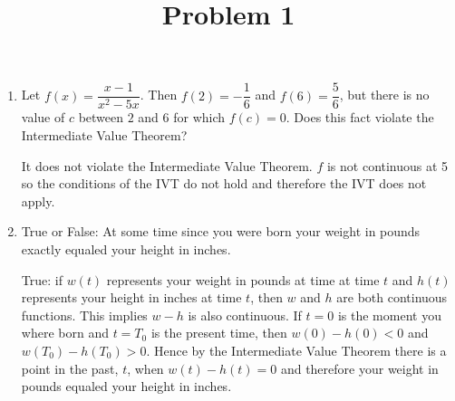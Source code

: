 \documentclass{ximera}
\title[Problem 1]{Problem 1}
\begin{document}
\begin{abstract} \end{abstract}
\maketitle


\begin{problem}
	\begin{enumerate}
   	\item  Let $f(x) = \dfrac{x-1}{x^2 - 5x}$.  Then $f(2)=-\dfrac{1}{6}$ and $f(6)=\dfrac{5}{6}$, but there is no value of $c$ between $2$ and $6$ for which $f(c)=0$.  Does this fact violate the Intermediate Value Theorem?
\begin{explanation}
        It does not violate the Intermediate Value Theorem.  $f$ is not continuous at 5 so the conditions of the IVT do not hold and therefore the IVT does not apply.
      \end{explanation}

	\item	True or False: At some time since you were born your weight in pounds exactly equaled your height in inches.
\begin{explanation}
        True: if $w(t)$ represents your weight in pounds at time at time $t$ and $h(t)$ represents your height in inches at time $t$, then $w$ and $h$ are both continuous functions.  This implies $w - h$ is also continuous.
        If $t = 0$ is the moment you where born and $t = T_0$ is the present time, then $w(0) - h(0) < 0$ and $w(T_0) - h(T_0) > 0$.
        Hence by the Intermediate Value Theorem there is a point in the past, $t$, when $w(t)-h(t)=0$ and therefore your weight in pounds equaled your height in inches.
      \end{explanation}
	
	\end{enumerate}

\end{problem}
\end{document}
